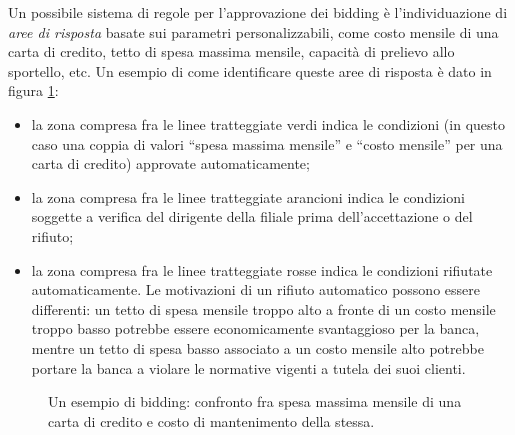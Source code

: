 Un possibile sistema di regole per l'approvazione dei bidding \`e l'individuazione di \emph{aree di risposta} basate sui parametri personalizzabili, come costo mensile di una carta di credito, tetto di spesa massima mensile, capacit\`a di prelievo allo sportello, etc.
Un esempio di come identificare queste aree di risposta \`e dato in figura \ref{fig:bidding}:
\begin{itemize}
	\item la zona compresa fra le linee tratteggiate verdi indica le condizioni (in questo caso una coppia di valori ``spesa massima mensile'' e ``costo mensile'' per una carta di credito) approvate automaticamente;
	\item la zona compresa fra le linee tratteggiate arancioni indica le condizioni soggette a verifica del dirigente della filiale prima dell'accettazione o del rifiuto;
	\item la zona compresa fra le linee tratteggiate rosse indica le condizioni rifiutate automaticamente.
		Le motivazioni di un rifiuto automatico possono essere differenti: un tetto di spesa mensile troppo alto a fronte di un costo mensile troppo basso potrebbe essere economicamente svantaggioso per la banca, mentre un tetto di spesa basso associato a un costo mensile alto potrebbe portare la banca a violare le normative vigenti a tutela dei suoi clienti.
\end{itemize}

\begin{figure}
	\caption{Un esempio di bidding: confronto fra spesa massima mensile di una carta di credito e costo di mantenimento della stessa.}
	\label{fig:bidding}
\end{figure}

